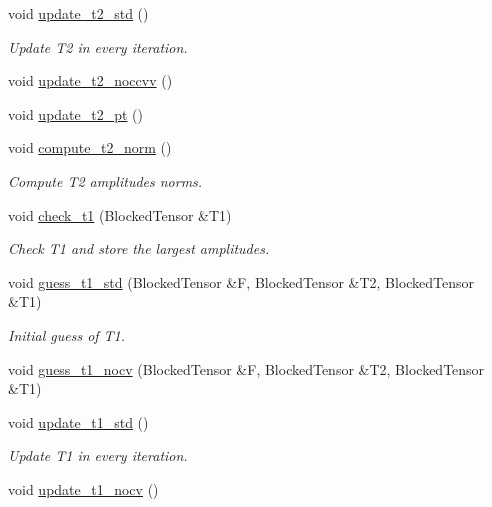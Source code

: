 \begin{DoxyCompactItemize}
\item 
void \mbox{\hyperlink{classforte_1_1_m_r_d_s_r_g_afeeae1749cfe63b553697bfa3fffdbe9}{update\+\_\+t2\+\_\+std}} ()
\begin{DoxyCompactList}\small\item\em Update T2 in every iteration. \end{DoxyCompactList}\item 
void \mbox{\hyperlink{classforte_1_1_m_r_d_s_r_g_a7a33ae32385ecd61769a1dfb0d315d55}{update\+\_\+t2\+\_\+noccvv}} ()
\item 
void \mbox{\hyperlink{classforte_1_1_m_r_d_s_r_g_aa3dec4155c8d90a180e98f8de3b209b1}{update\+\_\+t2\+\_\+pt}} ()
\item 
void \mbox{\hyperlink{classforte_1_1_m_r_d_s_r_g_a58bf6c2c7eff247c638b2bc6b5aaa784}{compute\+\_\+t2\+\_\+norm}} ()
\begin{DoxyCompactList}\small\item\em Compute T2 amplitudes norms. \end{DoxyCompactList}\item 
void \mbox{\hyperlink{classforte_1_1_m_r_d_s_r_g_a4328f68a1c79473817f1d70d7ac4616a}{check\+\_\+t1}} (Blocked\+Tensor \&T1)
\begin{DoxyCompactList}\small\item\em Check T1 and store the largest amplitudes. \end{DoxyCompactList}\item 
void \mbox{\hyperlink{classforte_1_1_m_r_d_s_r_g_ad164d9309dbf62d528304383dea69255}{guess\+\_\+t1\+\_\+std}} (Blocked\+Tensor \&F, Blocked\+Tensor \&T2, Blocked\+Tensor \&T1)
\begin{DoxyCompactList}\small\item\em Initial guess of T1. \end{DoxyCompactList}\item 
void \mbox{\hyperlink{classforte_1_1_m_r_d_s_r_g_ab3b2210b0d8a621a9c2b7364d403052d}{guess\+\_\+t1\+\_\+nocv}} (Blocked\+Tensor \&F, Blocked\+Tensor \&T2, Blocked\+Tensor \&T1)
\item 
void \mbox{\hyperlink{classforte_1_1_m_r_d_s_r_g_af0406f2614ef646d92ae035206cff545}{update\+\_\+t1\+\_\+std}} ()
\begin{DoxyCompactList}\small\item\em Update T1 in every iteration. \end{DoxyCompactList}\item 
void \mbox{\hyperlink{classforte_1_1_m_r_d_s_r_g_aafdd63af24ffbd1924b9a62eaf21c795}{update\+\_\+t1\+\_\+nocv}} ()

\end{DoxyCompactItemize}
